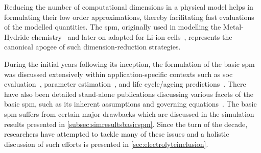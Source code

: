

Reducing  the number  of  computational  dimensions in  a  physical model  helps
in  formulating  their  low  order  approximations,  thereby  facilitating  fast
evaluations  of  the modelled  quantities.  The  \gls{spm}, originally  used  in
modelling  the Metal-Hydride  chemistry~\cite{Haran1998}  and  later on  adapted
for  Li-ion  cells~\cite{Ning2004},  represents  the canonical  apogee  of  such
dimension-reduction strategies.


During  the  initial years  following  its  inception,  the formulation  of  the
basic \gls{spm}  was discussed extensively within  application-specific contexts
such  as  \gls{soc}  evaluation~\cite{Santhanagopalan2006a,Santhanagopalan2008},
parameter    estimation~\cite{Santhanagopalan2007},   and    life   cycle/ageing
predictions~\cite{Santhanagopalan2008a,Safari2009}.   There   have   also   been
detailed   stand-alone   publications   discussing   various   facets   of   the
basic   \gls{spm},   such   as    its   inherent   assumptions   and   governing
equations~\cite{Santhanagopalan2006,Chaturvedi2010}. The basic \gls{spm} suffers
from  certain major  drawbacks which  are  discussed in  the simulation  results
presented  in \cref{subsec:simresultsbasicspm}.  Since the  turn of  the decade,
researchers  have attempted  to  tackle  many of  these  issues  and a  holistic
discussion of such efforts is presented in \cref{sec:electrolyteinclusion}.

